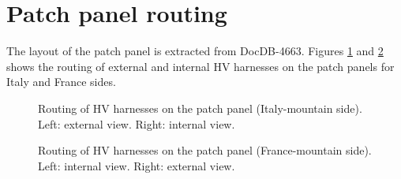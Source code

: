 
\clearpage
\section{Patch panel routing}

The layout of the patch panel is extracted from DocDB-4663.
Figures \ref{fig:calohv:pp:0} and \ref{fig:calohv:pp:1}
shows the routing of external and internal HV harnesses
on the patch panels for Italy and France sides.

\begin{figure}[h!]
  \begin{center}
    \scalebox{0.5}{}
  \end{center}
  \caption{Routing of HV harnesses on the patch panel (Italy-mountain side). Left: external view. Right: internal view.}
  \label{fig:calohv:pp:0}
\end{figure}

\begin{figure}[h!]
  \begin{center}
    \scalebox{0.5}{}
  \end{center}
  \caption{Routing of HV harnesses on the patch panel (France-mountain side). Left: internal view. Right: external view.}
  \label{fig:calohv:pp:1}
\end{figure}


